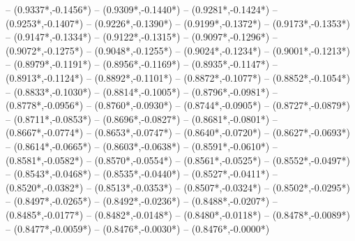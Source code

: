 {	-- ({0.9337*\dx},{-0.1456*\dy})
	-- ({0.9309*\dx},{-0.1440*\dy})
	-- ({0.9281*\dx},{-0.1424*\dy})
	-- ({0.9253*\dx},{-0.1407*\dy})
	-- ({0.9226*\dx},{-0.1390*\dy})
	-- ({0.9199*\dx},{-0.1372*\dy})
	-- ({0.9173*\dx},{-0.1353*\dy})
	-- ({0.9147*\dx},{-0.1334*\dy})
	-- ({0.9122*\dx},{-0.1315*\dy})
	-- ({0.9097*\dx},{-0.1296*\dy})
	-- ({0.9072*\dx},{-0.1275*\dy})
	-- ({0.9048*\dx},{-0.1255*\dy})
	-- ({0.9024*\dx},{-0.1234*\dy})
	-- ({0.9001*\dx},{-0.1213*\dy})
	-- ({0.8979*\dx},{-0.1191*\dy})
	-- ({0.8956*\dx},{-0.1169*\dy})
	-- ({0.8935*\dx},{-0.1147*\dy})
	-- ({0.8913*\dx},{-0.1124*\dy})
	-- ({0.8892*\dx},{-0.1101*\dy})
	-- ({0.8872*\dx},{-0.1077*\dy})
	-- ({0.8852*\dx},{-0.1054*\dy})
	-- ({0.8833*\dx},{-0.1030*\dy})
	-- ({0.8814*\dx},{-0.1005*\dy})
	-- ({0.8796*\dx},{-0.0981*\dy})
	-- ({0.8778*\dx},{-0.0956*\dy})
	-- ({0.8760*\dx},{-0.0930*\dy})
	-- ({0.8744*\dx},{-0.0905*\dy})
	-- ({0.8727*\dx},{-0.0879*\dy})
	-- ({0.8711*\dx},{-0.0853*\dy})
	-- ({0.8696*\dx},{-0.0827*\dy})
	-- ({0.8681*\dx},{-0.0801*\dy})
	-- ({0.8667*\dx},{-0.0774*\dy})
	-- ({0.8653*\dx},{-0.0747*\dy})
	-- ({0.8640*\dx},{-0.0720*\dy})
	-- ({0.8627*\dx},{-0.0693*\dy})
	-- ({0.8614*\dx},{-0.0665*\dy})
	-- ({0.8603*\dx},{-0.0638*\dy})
	-- ({0.8591*\dx},{-0.0610*\dy})
	-- ({0.8581*\dx},{-0.0582*\dy})
	-- ({0.8570*\dx},{-0.0554*\dy})
	-- ({0.8561*\dx},{-0.0525*\dy})
	-- ({0.8552*\dx},{-0.0497*\dy})
	-- ({0.8543*\dx},{-0.0468*\dy})
	-- ({0.8535*\dx},{-0.0440*\dy})
	-- ({0.8527*\dx},{-0.0411*\dy})
	-- ({0.8520*\dx},{-0.0382*\dy})
	-- ({0.8513*\dx},{-0.0353*\dy})
	-- ({0.8507*\dx},{-0.0324*\dy})
	-- ({0.8502*\dx},{-0.0295*\dy})
	-- ({0.8497*\dx},{-0.0265*\dy})
	-- ({0.8492*\dx},{-0.0236*\dy})
	-- ({0.8488*\dx},{-0.0207*\dy})
	-- ({0.8485*\dx},{-0.0177*\dy})
	-- ({0.8482*\dx},{-0.0148*\dy})
	-- ({0.8480*\dx},{-0.0118*\dy})
	-- ({0.8478*\dx},{-0.0089*\dy})
	-- ({0.8477*\dx},{-0.0059*\dy})
	-- ({0.8476*\dx},{-0.0030*\dy})
	-- ({0.8476*\dx},{-0.0000*\dy})
}
